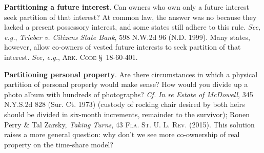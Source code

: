 \item \textbf{Partitioning a future interest}. Can owners who own only a future
interest seek partition of that interest? At common law, the answer was no
because they lacked a present possessory interest, and some states still adhere
to this rule. \emph{See, e.g.}, \emph{Trieber v. Citizens State Bank}, 598 N.W.2d 96 (N.D.
1999). Many states, however, allow co-owners of vested future interests to seek
partition of that interest. \emph{See, e.g.}, \textsc{Ark. Code} \S~18-60-401.

\item \textbf{Partitioning personal property}. Are there circumstances in which
a physical partition of personal property would make sense? How would you
divide up a photo album with hundreds of photographs? \textit{Cf.} \emph{In re
Estate of McDowell}, 345 N.Y.S.2d 828 (Sur. Ct. 1973) (custody of rocking chair
desired by both heirs should be divided in six-month increments, remainder to
the survivor); Ronen Perry \& Tal Zarsky, \textit{Taking Turns}, 43
\textsc{Fla. St. U. L. Rev.} (2015). This solution raises a more general
question: why don't we see more co-ownership of real property on the time-share
model?

